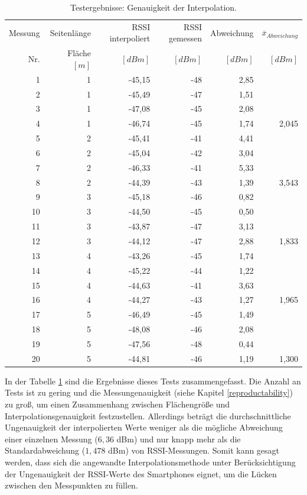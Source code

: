 \documentclass[10pt]{scrartcl}
\begin{document}
\begin{table}
\centering
\begin{tabular}{|r|r|r|r|r|r|}
\hline
Messung & Seitenlänge & RSSI interpoliert & RSSI gemessen & Abweichung & $\overline{x}_{Abweichung}$\\
Nr. & Fläche $[m]$ & $[dBm]$ & $[dBm]$ & $[dBm]$ & $[dBm]$\\\hline

1 & 1 & -45,15 & -48 & 2,85 & \\
2 & 1 & -45,49 & -47 & 1,51 & \\
3 & 1 & -47,08 & -45 & 2,08 & \\
4 & 1 & -46,74 & -45 & 1,74 & 2,045 \\\hline

5 & 2 & -45,41 & -41 & 4,41 & \\
6 & 2 & -45,04 & -42 & 3,04 & \\
7 & 2 & -46,33 & -41 & 5,33 & \\
8 & 2 & -44,39 & -43 & 1,39 & 3,543 \\\hline

9 & 3 & -45,18 & -46 & 0,82 & \\
10 & 3 & -44,50 & -45 & 0,50 & \\
11 & 3 & -43,87 & -47 & 3,13 & \\
12 & 3 & -44,12 & -47 & 2,88 & 1,833 \\\hline

13 & 4 & -43,26 & -45 & 1,74 & \\
14 & 4 & -45,22 & -44 & 1,22 & \\
15 & 4 & -44,63 & -41 & 3,63 & \\
16 & 4 & -44,27 & -43 & 1,27 & 1,965 \\\hline

17 & 5 & -46,49 & -45 & 1,49 & \\
18 & 5 & -48,08 & -46 & 2,08 & \\
19 & 5 & -47,56 & -48 & 0,44 & \\
20 & 5 & -44,81 & -46 & 1,19 & 1,300 \\\hline
\end{tabular}
\caption{\label{tab:interpolation}Testergebnisse: Genauigkeit der Interpolation.}
\end{table}

In der Tabelle \ref{tab:interpolation} sind die Ergebnisse dieses Tests zusammengefasst. Die Anzahl an Tests ist zu gering und die Messungenauigkeit (siehe Kapitel \ref{reproductability}) zu groß, um einen Zusammenhang zwischen Flächengröße und Interpolationsgenauigkeit festzustellen. Allerdings beträgt die durchschnittliche Ungenauigkeit der interpolierten Werte weniger als die mögliche Abweichung einer einzelnen Messung ($6,36$ dBm) und nur knapp mehr als die Standardabweichung ($1,478$ dBm) von RSSI-Messungen. Somit kann gesagt werden, dass sich die angewandte Interpolationsmethode unter Berücksichtigung der Ungenauigkeit der RSSI-Werte des Smartphones eignet, um die Lücken zwischen den Messpunkten zu füllen.
\end{document}
